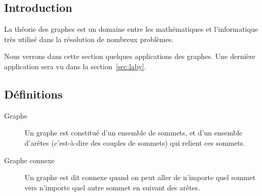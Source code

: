 \subsection{Introduction}
  La théorie des graphes est un domaine entre les mathématiques et
  l'informatique très utilisé dans la résolution de nombreux problèmes.
  
  Nous verrons dans cette section quelques applications des graphes. Une
  dernière application sera vu dans la section~\ref{sec:laby}.

\subsection{Définitions}
  \begin{description}
    \item[Graphe] Un graphe est constitué d'un ensemble de sommets, et d'un
      ensemble d'arêtes (c'est-à-dire des couples de sommets) qui relient ces
      sommets.
      \begin{center}
      \end{center}
    \item[Graphe connexe] Un graphe est dit connexe quand on peut aller de
      n'importe quel sommet vers n'importe quel autre sommet en suivant des
      arêtes.
      \begin{center}
\end{center}
\end{description}
